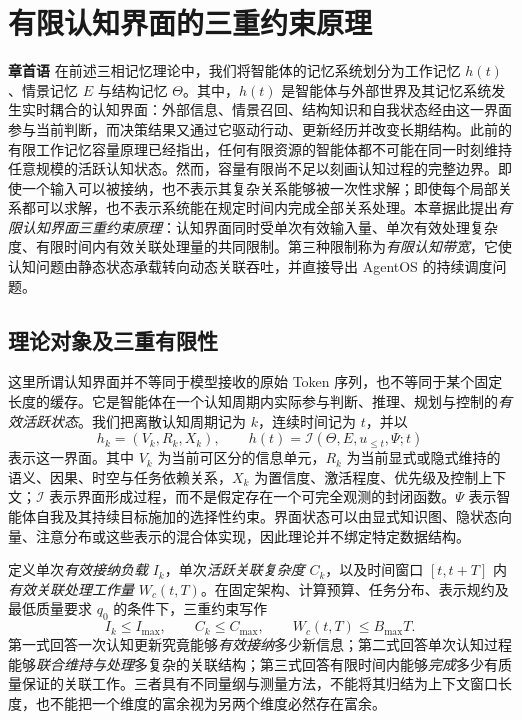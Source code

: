 \chapter{有限认知界面的三重约束原理}
\label{chap:triple_bounded_interface}

\noindent\textbf{章首语}\quad
在前述三相记忆理论中，我们将智能体的记忆系统划分为工作记忆 $h(t)$、情景记忆 $E$ 与结构记忆 $\Theta$。其中，$h(t)$ 是智能体与外部世界及其记忆系统发生实时耦合的认知界面：外部信息、情景召回、结构知识和自我状态经由这一界面参与当前判断，而决策结果又通过它驱动行动、更新经历并改变长期结构。此前的有限工作记忆容量原理已经指出，任何有限资源的智能体都不可能在同一时刻维持任意规模的活跃认知状态。然而，容量有限尚不足以刻画认知过程的完整边界。即使一个输入可以被接纳，也不表示其复杂关系能够被一次性求解；即使每个局部关系都可以求解，也不表示系统能在规定时间内完成全部关系处理。本章据此提出\emph{有限认知界面三重约束原理}：认知界面同时受单次有效输入量、单次有效处理复杂度、有限时间内有效关联处理量的共同限制。第三种限制称为\emph{有限认知带宽}，它使认知问题由静态状态承载转向动态关联吞吐，并直接导出 AgentOS 的持续调度问题。

\section{理论对象及三重有限性}
\label{sec:three_limits}

这里所谓认知界面并不等同于模型接收的原始 Token 序列，也不等同于某个固定长度的缓存。它是智能体在一个认知周期内实际参与判断、推理、规划与控制的\emph{有效活跃状态}。我们把离散认知周期记为 $k$，连续时间记为 $t$，并以
\begin{equation}
 h_k=(V_k,R_k,X_k),\qquad h(t)=\mathcal{I}(\Theta,E,u_{\leq t},\Psi; t)
 \label{eq:h_interface}
\end{equation}
表示这一界面。其中 $V_k$ 为当前可区分的信息单元，$R_k$ 为当前显式或隐式维持的语义、因果、时空与任务依赖关系，$X_k$ 为置信度、激活程度、优先级及控制上下文；$\mathcal I$ 表示界面形成过程，而不是假定存在一个可完全观测的封闭函数。$\Psi$ 表示智能体自我及其持续目标施加的选择性约束。界面状态可以由显式知识图、隐状态向量、注意分布或这些表示的混合体实现，因此理论并不绑定特定数据结构。

定义单次\emph{有效接纳负载} $I_k$，单次\emph{活跃关联复杂度} $C_k$，以及时间窗口 $[t,t+T]$ 内\emph{有效关联处理工作量} $W_c(t,T)$。在固定架构、计算预算、任务分布、表示规约及最低质量要求 $q_0$ 的条件下，三重约束写作
\begin{equation}
\boxed{ I_k\leq I_{\max},\qquad C_k\leq C_{\max},\qquad W_c(t,T)\leq B_{\max}T. }
\label{eq:triple_bound}
\end{equation}
第一式回答一次认知更新究竟能够\emph{有效接纳}多少新信息；第二式回答单次认知过程能够\emph{联合维持与处理}多复杂的关联结构；第三式回答有限时间内能够\emph{完成}多少有质量保证的关联工作。三者具有不同量纲与测量方法，不能将其归结为上下文窗口长度，也不能把一个维度的富余视为另两个维度必然存在富余。

